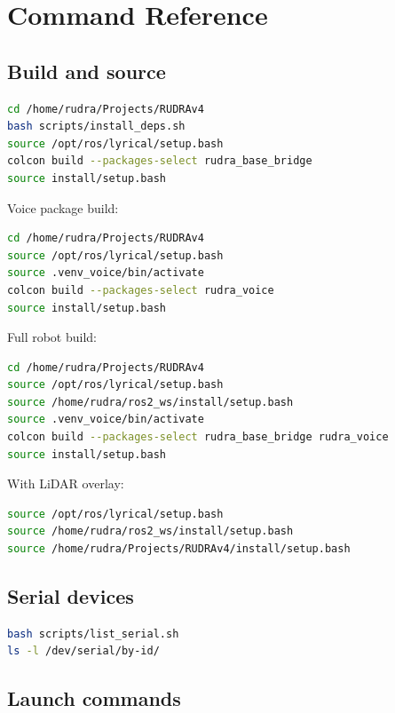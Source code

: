\chapter{Command Reference}

\section{Build and source}

\begin{lstlisting}[language=bash]
cd /home/rudra/Projects/RUDRAv4
bash scripts/install_deps.sh
source /opt/ros/lyrical/setup.bash
colcon build --packages-select rudra_base_bridge
source install/setup.bash
\end{lstlisting}

Voice package build:

\begin{lstlisting}[language=bash]
cd /home/rudra/Projects/RUDRAv4
source /opt/ros/lyrical/setup.bash
source .venv_voice/bin/activate
colcon build --packages-select rudra_voice
source install/setup.bash
\end{lstlisting}

Full robot build:

\begin{lstlisting}[language=bash]
cd /home/rudra/Projects/RUDRAv4
source /opt/ros/lyrical/setup.bash
source /home/rudra/ros2_ws/install/setup.bash
source .venv_voice/bin/activate
colcon build --packages-select rudra_base_bridge rudra_voice
source install/setup.bash
\end{lstlisting}

With LiDAR overlay:

\begin{lstlisting}[language=bash]
source /opt/ros/lyrical/setup.bash
source /home/rudra/ros2_ws/install/setup.bash
source /home/rudra/Projects/RUDRAv4/install/setup.bash
\end{lstlisting}

\section{Serial devices}

\begin{lstlisting}[language=bash]
bash scripts/list_serial.sh
ls -l /dev/serial/by-id/
\end{lstlisting}

\section{Launch commands}

